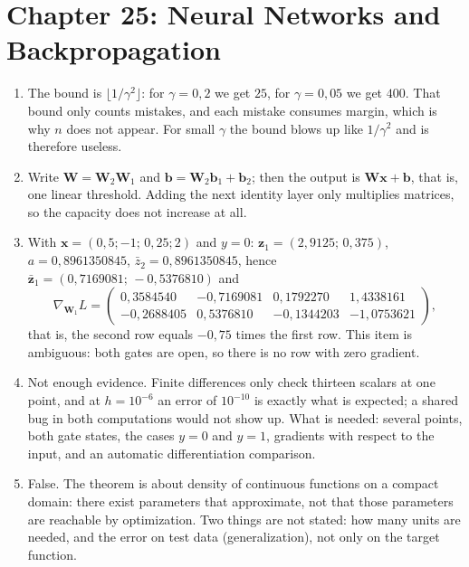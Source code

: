 \section*{Chapter 25: Neural Networks and Backpropagation}
\begin{enumerate}[label=\textbf{25.\arabic*}]
  \item The bound is $\lfloor1/\gamma^{2}\rfloor$: for $\gamma=0{,}2$ we get $25$,
        for $\gamma=0{,}05$ we get $400$. That bound only counts mistakes,
        and each mistake consumes margin, which is why $n$ does not appear. For
        small $\gamma$ the bound blows up like $1/\gamma^{2}$ and is therefore useless.

  \item Write $\mathbf{W}=\mathbf{W}_{2}\mathbf{W}_{1}$ and
        $\mathbf{b}=\mathbf{W}_{2}\mathbf{b}_{1}+\mathbf{b}_{2}$; then the output is
        $\mathbf{W}\mathbf{x}+\mathbf{b}$, that is, one linear threshold. Adding the next
        identity layer only multiplies matrices, so the capacity does not
        increase at all.

  \item With $\mathbf{x}=(0{,}5;-1;\,0{,}25;2)$ and $y=0$: $\mathbf{z}_{1}=(2{,}9125;\,
        0{,}375)$, $a=0{,}8961350845$, $\bar{z}_{2}=0{,}8961350845$, hence
        $\bar{\mathbf{z}}_{1}=(0{,}7169081;\,-0{,}5376810)$ and
        \[
          \nabla_{\mathbf{W}_{1}}L=
          \begin{pmatrix}
            0{,}3584540 & -0{,}7169081 & 0{,}1792270 & 1{,}4338161\\
            -0{,}2688405 & 0{,}5376810 & -0{,}1344203 & -1{,}0753621
          \end{pmatrix},
        \]
        that is, the second row equals $-0{,}75$ times the first row. This item is
        ambiguous: both gates are open, so there is no row with zero gradient.

  \item Not enough evidence. Finite differences only check thirteen scalars at one
        point, and at $h=10^{-6}$ an error of $10^{-10}$ is exactly what is expected; a
        shared bug in both computations would not show up. What is needed: several points,
        both gate states, the cases $y=0$ and $y=1$, gradients with respect to the input, and
        an automatic differentiation comparison.

  \item False. The theorem is about density of continuous functions on a
        compact domain: there exist parameters that approximate, not that those parameters
        are reachable by optimization. Two things are not stated: how many units are
        needed, and the error on test data (generalization), not only on the target
        function.


\end{enumerate}
